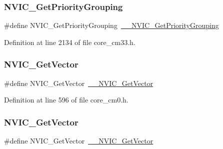 \subsubsection{\texorpdfstring{N\+V\+I\+C\+\_\+\+Get\+Priority\+Grouping}{NVIC\_GetPriorityGrouping}\hspace{0.1cm}{\footnotesize\ttfamily [11/11]}}
{\footnotesize\ttfamily \#define N\+V\+I\+C\+\_\+\+Get\+Priority\+Grouping~\hyperlink{group___c_m_s_i_s___core___n_v_i_c_functions_ga9b894af672df4373eb637f8288845c05}{\+\_\+\+\_\+\+N\+V\+I\+C\+\_\+\+Get\+Priority\+Grouping}}



Definition at line 2134 of file core\+\_\+cm33.\+h.

\mbox{\label{group___c_m_s_i_s___core___n_v_i_c_functions_ga955eb1c33a3dcc62af11a8385e8c0fc8}} 
\subsubsection{\texorpdfstring{N\+V\+I\+C\+\_\+\+Get\+Vector}{NVIC\_GetVector}\hspace{0.1cm}{\footnotesize\ttfamily [1/13]}}
{\footnotesize\ttfamily \#define N\+V\+I\+C\+\_\+\+Get\+Vector~\hyperlink{group___c_m_s_i_s___core___n_v_i_c_functions_ga44b665d2afb708121d9b10c76ff00ee5}{\+\_\+\+\_\+\+N\+V\+I\+C\+\_\+\+Get\+Vector}}



Definition at line 596 of file core\+\_\+cm0.\+h.

\mbox{\label{group___c_m_s_i_s___core___n_v_i_c_functions_ga955eb1c33a3dcc62af11a8385e8c0fc8}} 
\subsubsection{\texorpdfstring{N\+V\+I\+C\+\_\+\+Get\+Vector}{NVIC\_GetVector}\hspace{0.1cm}{\footnotesize\ttfamily [2/13]}}
{\footnotesize\ttfamily \#define N\+V\+I\+C\+\_\+\+Get\+Vector~\hyperlink{group___c_m_s_i_s___core___n_v_i_c_functions_ga44b665d2afb708121d9b10c76ff00ee5}{\+\_\+\+\_\+\+N\+V\+I\+C\+\_\+\+Get\+Vector}}



